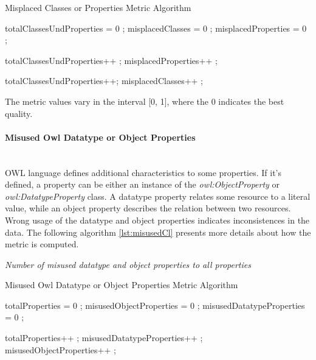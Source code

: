\begin{algorithm}
\caption{Misplaced Classes or Properties Metric Algorithm}\label{lst:misplacedCl}
\begin{algorithmic}[1]
\State totalClassesUndProperties = 0 ;
\State misplacedClasses = 0 ;
\State misplacedProperties = 0 ;
\EndProcedure

 totalClassesUndProperties++ ;\EndIf 
{} misplacedProperties++ ; \EndIf 

 totalClassesUndProperties++; \EndIf  
{} misplacedClasses++ ; \EndIf 
{}
\EndProcedure
\end{algorithmic}
\end{algorithm}

The metric values vary in the interval [0, 1], where  the 0 indicates the best quality.


\paragraph{Misused Owl Datatype or Object Properties} ~\\

OWL language defines additional characteristics to some properties. 
If it's defined, a property can be either an instance of the \textit{owl:ObjectProperty} or \textit{owl:DatatypeProperty} class.
A datatype property relates some resource to a literal value, while an object property describes the relation between two resources.
Wrong usage of the datatype and object properties indicates inconsistences in the data.
The following algorithm  \ref{lst:misusedCl} presents more details about how the metric is computed.

\begin{mdframed}[style=metricdefinition]
\emph{Number of misused datatype and object properties to all properties}
\end{mdframed}


\begin{algorithm}
\caption{Misused Owl Datatype or Object Properties Metric Algorithm} \label{lst:misusedCl}
\begin{algorithmic}[1]
\State totalProperties = 0 ;
\State misusedObjectProperties = 0 ;
\State misusedDatatypeProperties = 0 ;
\EndProcedure

 totalProperties++ ;\EndIf 
{} misusedDatatypeProperties++ ; \EndIf 
{} misusedObjectProperties++ ; \EndIf 
{}
\EndProcedure
\end{algorithmic}
\end{algorithm}

